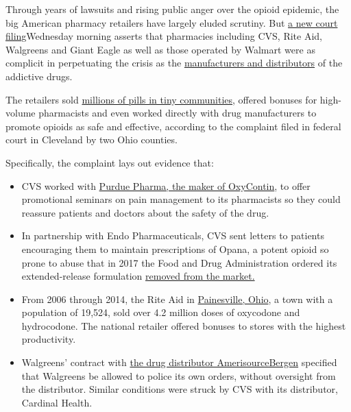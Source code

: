 Through years of lawsuits and rising public anger over the opioid
epidemic, the big American pharmacy retailers have largely eluded
scrutiny. But
\href{https://www.lakecountyohio.gov/Portals/4/3306-2\%20Ex_\%20B\%20to\%20CT3\%20Plfs\%27\%20Notice\%20of\%20Redacted\%20Exhibits\%20to\%20Mtn\%20for\%20Leave\%20\%28Lake\%20Proposed\%20Supp_\%29.pdf}{a
new court filing}Wednesday morning asserts that pharmacies including
CVS, Rite Aid, Walgreens and Giant Eagle as well as those operated by
Walmart were as complicit in perpetuating the crisis as the
\href{https://www.nytimes3xbfgragh.onion/2019/10/21/health/opioid-settlement.html}{manufacturers
and distributors} of the addictive drugs.

The retailers sold
\href{https://www.nytimes3xbfgragh.onion/2019/07/19/health/opioids-trial-addiction-drugstores.html}{millions
of pills in tiny communities}, offered bonuses for high-volume
pharmacists and even worked directly with drug manufacturers to promote
opioids as safe and effective, according to the complaint filed in
federal court in Cleveland by two Ohio counties.

Specifically, the complaint lays out evidence that:

\begin{itemize}
\item
  CVS worked with
  \href{https://www.nytimes3xbfgragh.onion/2020/04/13/upshot/opioids-oxycontin-purdue-pharma.html}{Purdue
  Pharma, the maker of OxyContin}, to offer promotional seminars on pain
  management to its pharmacists so they could reassure patients and
  doctors about the safety of the drug.
\item
  In partnership with Endo Pharmaceuticals, CVS sent letters to patients
  encouraging them to maintain prescriptions of Opana, a potent opioid
  so prone to abuse that in 2017 the Food and Drug Administration
  ordered its extended-release formulation
  \href{https://www.nytimes3xbfgragh.onion/2017/06/08/health/fda-opioid-opana-er.html}{removed
  from the market.}
\item
  From 2006 through 2014, the Rite Aid in
  \href{https://www.cleveland.com/metro/2017/02/fentanyl_overdose_deaths_soar.html}{Painesville,
  Ohio}, a town with a population of 19,524, sold over 4.2 million doses
  of oxycodone and hydrocodone. The national retailer offered bonuses to
  stores with the highest productivity.
\item
  Walgreens' contract with
  \href{https://www.nytimes3xbfgragh.onion/2019/04/22/health/opioids-lawsuits-distributors.html}{the
  drug distributor AmerisourceBergen} specified that Walgreens be
  allowed to police its own orders, without oversight from the
  distributor. Similar conditions were struck by CVS with its
  distributor, Cardinal Health.
\end{itemize}

